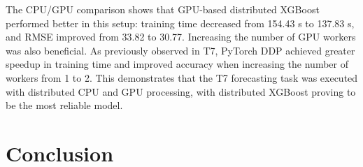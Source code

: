 \documentclass[fleqn,moreauthors,9pt]{ds_report}
\begin{document}
\begin{table}[h]
\centering
\caption{Distributed CPU/GPU and scalability results for T10.}
\label{tab:t10distributed}
\scriptsize
{}
\end{table}

The CPU/GPU comparison shows that GPU-based distributed XGBoost performed better in this setup: training time decreased from 154.43 s to 137.83 s, and RMSE improved from 33.82 to 30.77. Increasing the number of GPU workers was also beneficial. As previously observed in T7, PyTorch DDP achieved greater speedup in training time and improved accuracy when increasing the number of workers from 1 to 2. This demonstrates that the T7 forecasting task was executed with distributed CPU and GPU processing, with distributed XGBoost proving to be the most reliable model.


\section*{Conclusion}
\end{document}
